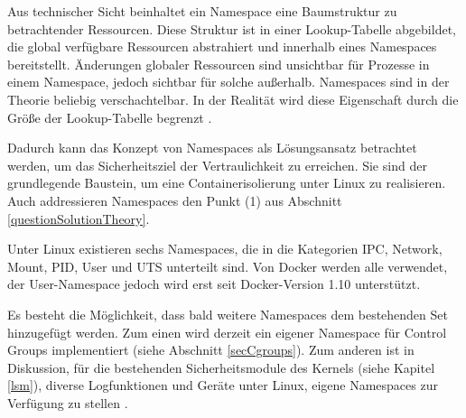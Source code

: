 \documentclass[../main.tex]{subfiles}
\begin{document}




		Aus technischer Sicht beinhaltet ein Namespace eine Baumstruktur zu betrachtender Ressourcen. Diese Struktur ist in einer Lookup-Tabelle abgebildet, die global verfügbare Ressourcen abstrahiert und innerhalb eines Namespaces bereitstellt. Änderungen globaler Ressourcen sind unsichtbar für Prozesse in einem Namespace, jedoch sichtbar für solche außerhalb. Namespaces sind in der Theorie beliebig verschachtelbar. In der Realität wird diese Eigenschaft durch die Größe der Lookup-Tabelle begrenzt \cite[S.1f.]{IBMcheckpointRestart}\cite{namespaces}.

		Dadurch kann das Konzept von Namespaces als Lösungsansatz betrachtet werden, um das Sicherheitsziel der Vertraulichkeit zu erreichen. Sie sind der grundlegende Baustein, um eine Containerisolierung unter Linux zu realisieren. Auch addressieren Namespaces den Punkt (1) aus Abschnitt \ref{questionSolutionTheory}.

		Unter Linux existieren sechs Namespaces, die in die Kategorien IPC, Network, Mount, PID, User und UTS unterteilt sind. Von Docker werden alle verwendet, der User-Namespace jedoch wird erst seit Docker-Version 1.10 unterstützt.

		Es besteht die Möglichkeit, dass bald weitere Namespaces dem bestehenden Set hinzugefügt werden. Zum einen wird derzeit ein eigener Namespace für Control Groups implementiert (siehe Abschnitt \ref{secCgroups}). Zum anderen ist in Diskussion, für die bestehenden Sicherheitsmodule des Kernels (siehe Kapitel \ref{lsm}), diverse Logfunktionen und Geräte unter Linux, eigene Namespaces zur Verfügung zu stellen \cite[S.19]{presContainerSec}.


\end{document}
